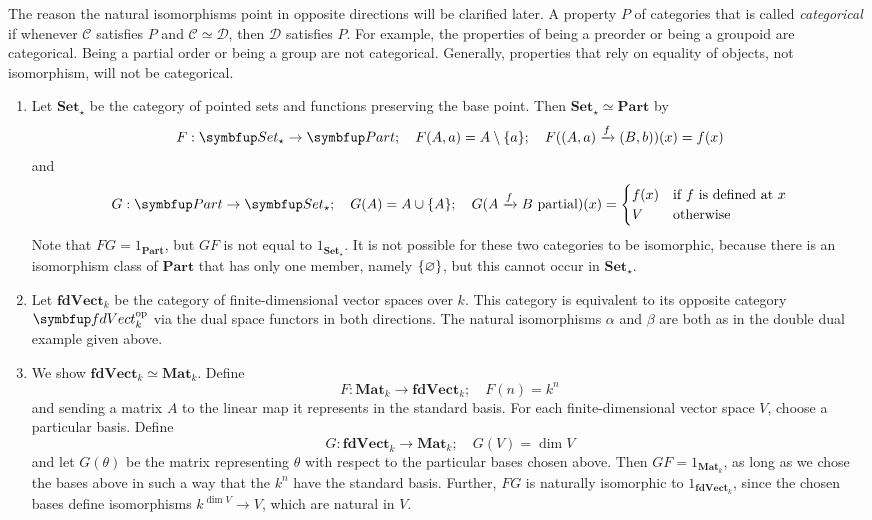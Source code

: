 The reason the natural isomorphisms point in opposite directions will be clarified later.
A property \( P \) of categories that is called \emph{categorical} if whenever \( \mathcal C \) satisfies \( P \) and \( \mathcal C \simeq \mathcal D \), then \( \mathcal D \) satisfies \( P \).
For example, the properties of being a preorder or being a groupoid are categorical.
Being a partial order or being a group are not categorical.
Generally, properties that rely on equality of objects, not isomorphism, will not be categorical.
\begin{example}
    \begin{enumerate}
        \item Let \( \mathbf{Set}_\star \) be the category of pointed sets and functions preserving the base point.
        Then \( \mathbf{Set}_\star \simeq \mathbf{Part} \) by
        \[ F : \mathbf{Set}_\star \to \mathbf{Part};\quad F(A, a) = A \setminus \qty{a};\quad F((A, a) \xrightarrow f (B, b))(x) = f(x) \]
        and
        \[ G : \mathbf{Part} \to \mathbf{Set}_\star;\quad G(A) = A \cup \qty{A};\quad G(A \xrightarrow f B \text{ partial})(x) = \begin{cases}
            f(x) & \text{if } f \text{ is defined at } x \\
            V & \text{otherwise}
        \end{cases} \]
        Note that \( FG = 1_{\mathbf{Part}} \), but \( GF \) is not equal to \( 1_{\mathbf{Set}_\star} \).
        It is not possible for these two categories to be isomorphic, because there is an isomorphism class of \( \mathbf{Part} \) that has only one member, namely \( \qty{\varnothing} \), but this cannot occur in \( \mathbf{Set}_\star \).
        \item Let \( \mathbf{fdVect}_k \) be the category of finite-dimensional vector spaces over \( k \).
        This category is equivalent to its opposite category \( \mathbf{fdVect}_k^\cop \) via the dual space functors in both directions.
        The natural isomorphisms \( \alpha \) and \( \beta \) are both as in the double dual example given above.
        \item We show \( \mathbf{fdVect}_k \simeq \mathbf{Mat}_k \).
        Define
        \[ F : \mathbf{Mat}_k \to \mathbf{fdVect}_k;\quad F(n) = k^n \]
        and sending a matrix \( A \) to the linear map it represents in the standard basis.
        For each finite-dimensional vector space \( V \), choose a particular basis.
        Define
        \[ G : \mathbf{fdVect}_k \to \mathbf{Mat}_k;\quad G(V) = \dim V \]
        and let \( G(\theta) \) be the matrix representing \( \theta \) with respect to the particular bases chosen above.
        Then \( GF = 1_{\mathbf{Mat}_k} \), as long as we chose the bases above in such a way that the \( k^n \) have the standard basis.
        Further, \( FG \) is naturally isomorphic to \( 1_{\mathbf{fdVect}_k} \), since the chosen bases define isomorphisms \( k^{\dim V} \to V \), which are natural in \( V \).
    \end{enumerate}
\end{example}
